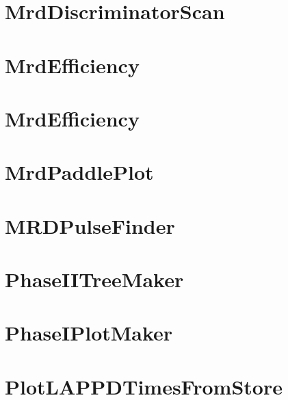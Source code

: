 \documentclass[twoside]{book}
\begin{document}
\chapter{Mrd\-Discriminator\-Scan}
\label{md_UserTools_MrdDiscriminatorScan_README}
\hypertarget{md_UserTools_MrdDiscriminatorScan_README}{}

\chapter{Mrd\-Efficiency}
\label{md_UserTools_MrdDistributions_README}
\hypertarget{md_UserTools_MrdDistributions_README}{}

\chapter{Mrd\-Efficiency}
\label{md_UserTools_MrdEfficiency_README}
\hypertarget{md_UserTools_MrdEfficiency_README}{}

\chapter{Mrd\-Paddle\-Plot}
\label{md_UserTools_MrdPaddlePlot_README}
\hypertarget{md_UserTools_MrdPaddlePlot_README}{}

\chapter{M\-R\-D\-Pulse\-Finder}
\label{md_UserTools_MRDPulseFinder_README}
\hypertarget{md_UserTools_MRDPulseFinder_README}{}

\chapter{Phase\-I\-I\-Tree\-Maker}
\label{md_UserTools_PhaseIITreeMaker_README}
\hypertarget{md_UserTools_PhaseIITreeMaker_README}{}

\chapter{Phase\-I\-Plot\-Maker}
\label{md_UserTools_PhaseITreeMaker_README}
\hypertarget{md_UserTools_PhaseITreeMaker_README}{}

\chapter{Plot\-L\-A\-P\-P\-D\-Times\-From\-Store}
\label{md_UserTools_PlotLAPPDTimesFromStore_README}
\hypertarget{md_UserTools_PlotLAPPDTimesFromStore_README}{}

\end{document}
